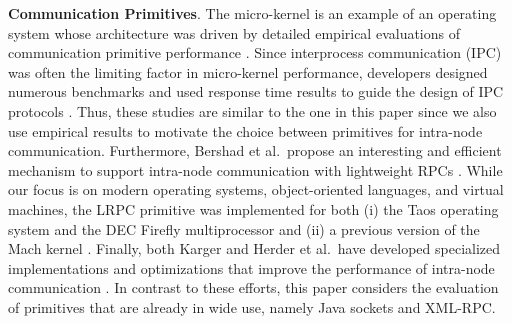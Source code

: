 \documentclass{sig-alternate}
\begin{document}
{\bf Communication Primitives}. The micro-kernel is an example of an
operating system whose architecture was driven by detailed empirical
evaluations of communication primitive performance
\cite{gefflaut-sawmill,liedtke-improve-ipc,liedtke-microkernels}.
Since interprocess communication (IPC) was often the limiting factor
in micro-kernel performance, developers designed numerous benchmarks
and used response time results to guide the design of IPC protocols
\cite{hartig-micro-kernel,liedtke-improve-ipc}.  Thus, these studies
are similar to the one in this paper since we also use empirical
results to motivate the choice between primitives for intra-node
communication.  Furthermore, Bershad et al.\ propose an interesting
and efficient mechanism to support intra-node communication with
lightweight RPCs \cite{bershad-lightweight}.  While our focus is on
modern operating systems, object-oriented languages, and virtual
machines, the LRPC primitive was implemented for both (i) the Taos
operating system and the DEC Firefly multiprocessor
\cite{bershad-lightweight} and (ii) a previous version of the Mach
kernel \cite{bourassa-implementing}.  Finally, both Karger and Herder
et al.\ have developed specialized implementations and optimizations
that improve the performance of intra-node communication
\cite{tanenbaum-minix3,karger-registers}.  In contrast to these
efforts, this paper considers the evaluation of primitives that are
already in wide use, namely Java sockets and XML-RPC.



\end{document}
